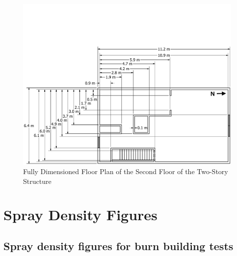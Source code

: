 \documentclass[12pt,oneside]{book}
\begin{document}
\begin{figure}[!ht]
	\includegraphics[width=\columnwidth]{../../DelCo_2014_2015/Drawings/PDFs/CAFS/West_Structure_2nd_Floor_Detailed}
	\caption{Fully Dimensioned Floor Plan of the Second Floor of the Two-Story Structure}
	\label{fig:dimensioned_second_2story_detailed}
\end{figure}


\chapter{Spray Density Figures}
\label{app:spray_density}

\section{Spray density figures for burn building tests}
\label{app:spray_bb}
\end{document}
